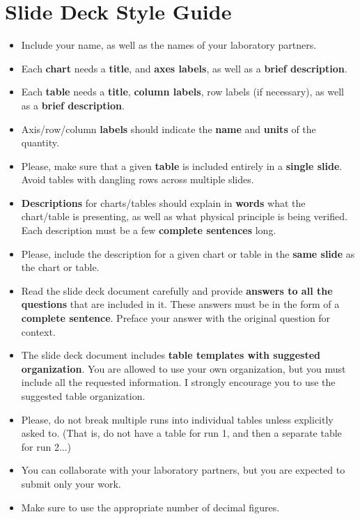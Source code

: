 \chapter{Slide Deck Style Guide}
%
\begin{itemize}
    \item Include your name, as well as the names of your laboratory partners.
    \item Each \textbf{chart} needs a \textbf{title}, and \textbf{axes labels}, as well as a \textbf{brief description}.
    \item Each \textbf{table} needs a \textbf{title}, \textbf{column labels}, row labels (if necessary), as well as a \textbf{brief description}.
    \item Axis/row/column \textbf{labels} should indicate the \textbf{name} and \textbf{units} of the quantity.
    \item Please, make sure that a given \textbf{table} is included entirely in a \textbf{single slide}. Avoid tables with dangling rows across multiple slides.
    \item \textbf{Descriptions} for charts/tables should explain in \textbf{words} what the chart/table is presenting, as well as what physical principle is being verified. Each description must be a few \textbf{complete sentences} long.
    \item Please, include the description for a given chart or table in the \textbf{same slide} as the chart or table.
    \item Read the slide deck document carefully and provide \textbf{answers to all the questions} that are included in it. These answers must be in the form of a \textbf{complete sentence}. Preface your answer with the original question for context.
    \item The slide deck document includes \textbf{table templates with suggested organization}. You are allowed to use your own organization, but you must include all the requested information. I strongly encourage you to use the suggested table organization.
    \item Please, do not break multiple runs into individual tables unless explicitly asked to. (That is, do not have a table for run 1, and then a separate table for run 2...)
    \item You can collaborate with your laboratory partners, but you are expected to submit only your work.
    \item Make sure to use the appropriate number of decimal figures.
\end{itemize}